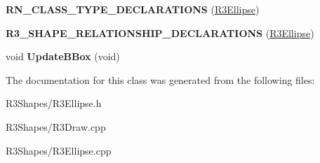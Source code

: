 \begin{DoxyCompactItemize}
\item 
{\bfseries R\+N\+\_\+\+C\+L\+A\+S\+S\+\_\+\+T\+Y\+P\+E\+\_\+\+D\+E\+C\+L\+A\+R\+A\+T\+I\+O\+NS} (\hyperlink{class_r3_ellipse}{R3\+Ellipse})\hypertarget{class_r3_ellipse_af48c0444869c515958799765122fd2dd}{}\label{class_r3_ellipse_af48c0444869c515958799765122fd2dd}

\item 
{\bfseries R3\+\_\+\+S\+H\+A\+P\+E\+\_\+\+R\+E\+L\+A\+T\+I\+O\+N\+S\+H\+I\+P\+\_\+\+D\+E\+C\+L\+A\+R\+A\+T\+I\+O\+NS} (\hyperlink{class_r3_ellipse}{R3\+Ellipse})\hypertarget{class_r3_ellipse_a9d6dae508cefebce0bd48b55bb896d3f}{}\label{class_r3_ellipse_a9d6dae508cefebce0bd48b55bb896d3f}

\item 
void {\bfseries Update\+B\+Box} (void)\hypertarget{class_r3_ellipse_a006d91a05d0bf56328c3146f264c5ec6}{}\label{class_r3_ellipse_a006d91a05d0bf56328c3146f264c5ec6}

\end{DoxyCompactItemize}


The documentation for this class was generated from the following files\+:\begin{DoxyCompactItemize}
\item 
R3\+Shapes/R3\+Ellipse.\+h\item 
R3\+Shapes/R3\+Draw.\+cpp\item 
R3\+Shapes/R3\+Ellipse.\+cpp\end{DoxyCompactItemize}
